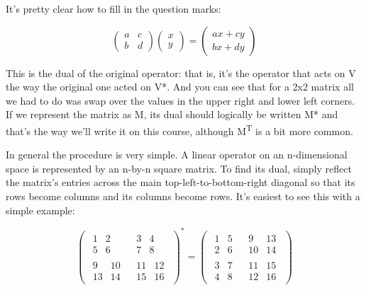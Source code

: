 \documentclass[oneside,english]{amsbook}
\numberwithin{section}{chapter}
\theoremstyle{plain}
\theoremstyle{definition}
\begin{document}
It's pretty clear how to fill in the question marks:

\[\begin{pmatrix}
	a & c \\
	b & d
\end{pmatrix}\begin{pmatrix}
	x \\
	y
\end{pmatrix} = \begin{pmatrix}
	ax + cy \\
	bx + dy
\end{pmatrix}\]

This is the dual of the original operator: that is, it's the operator
that acts on V the way the original one acted on V*. And you can see
that for a 2x2 matrix all we had to do was swap over the values in the
upper right and lower left corners. If we represent the matrix as M, its
dual should logically be written M* and that's the way we'll write it on
this course, although M\textsuperscript{T} is a bit more common.

In general the procedure is very simple. A linear operator on an
n-dimensional space is represented by an n-by-n square matrix. To find
its dual, simply reflect the matrix's entries across the main
top-left-to-bottom-right diagonal so that its rows become columns and
its columns become rows. It's easiest to see this with a simple example:

\[\begin{pmatrix}
	\begin{matrix}
		1 & 2 \\
		5 & 6
	\end{matrix} & \begin{matrix}
		3 & 4 \\
		7 & 8
	\end{matrix} \\
	\begin{matrix}
		9 & 10 \\
		13 & 14
	\end{matrix} & \begin{matrix}
		11 & 12 \\
		15 & 16
	\end{matrix}
\end{pmatrix}^{*} = \begin{pmatrix}
	\begin{matrix}
		1 & 5 \\
		2 & 6
	\end{matrix} & \begin{matrix}
		9 & 13 \\
		10 & 14
	\end{matrix} \\
	\begin{matrix}
		3 & 7 \\
		4 & 8
	\end{matrix} & \begin{matrix}
		11 & 15 \\
		12 & 16
	\end{matrix}
\end{pmatrix}\]
\end{document}
